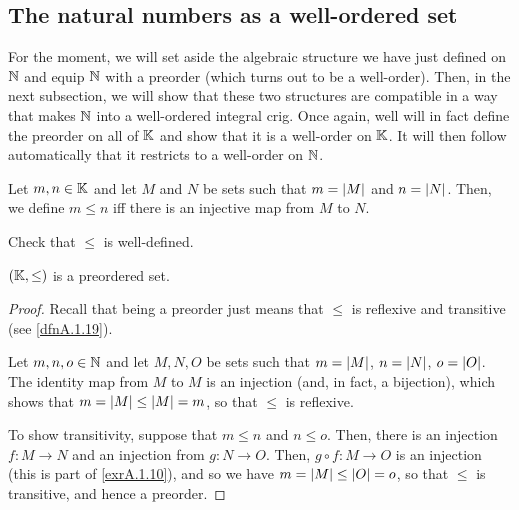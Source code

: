 \subsection{The natural numbers as a well-ordered set}

For the moment, we will set aside the algebraic structure we have just defined on $\mathbb{N}$ and equip $\mathbb{N}$ with a preorder (which turns out to be a well-order).  Then, in the next subsection, we will show that these two structures are compatible in a way that makes $\mathbb{N}$ into a well-ordered integral crig.  Once again, well will in fact define the preorder on all of $\mathbb{K}$ and show that it is a well-order on $\mathbb{K}$.  It will then follow automatically that it restricts to a well-order on $\mathbb{N}$.

\begin{dfn}\label{dfn1.1.23}
Let $m,n\in \mathbb{K}$ and let $M$ and $N$ be sets such that $m=\lvert M\rvert$ and $n=\lvert N\rvert$.  Then, we define $m\leq n$ iff there is an injective map from $M$ to $N$.
\begin{exr}
Check that $\leq$ is well-defined.
\end{exr}
\end{dfn}
\begin{prp}
$(\mathbb{K} ,\leq )$ is a preordered set.
\begin{proof}
Recall that being a preorder just means that $\leq$ is reflexive and transitive (see \cref{dfnA.1.19}).

Let $m,n,o\in \mathbb{N}$ and let $M,N,O$ be sets such that $m=\lvert M\rvert$, $n=\lvert N\rvert$, $o=\lvert O\rvert$.  The identity map from $M$ to $M$ is an injection (and, in fact, a bijection), which shows that $m=\lvert M\rvert\leq \lvert M\rvert=m$, so that $\leq$ is reflexive.

To show transitivity, suppose that $m\leq n$ and $n\leq o$.  Then, there is an injection $f:M\rightarrow N$ and an injection from $g:N\rightarrow O$.  Then, $g\circ f:M\rightarrow O$ is an injection (this is part of \cref{exrA.1.10}), and so we have $m=\lvert M\rvert\leq \lvert O\rvert=o$, so that $\leq$ is transitive, and hence a preorder.
\end{proof}
\end{prp}

